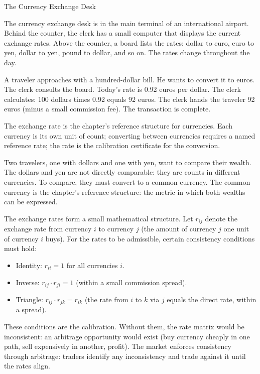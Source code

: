 \begin{coda}{The Currency Exchange Desk}

The currency exchange desk is in the main terminal of an international
airport. Behind the counter, the clerk has a small computer that
displays the current exchange rates. Above the counter, a board lists
the rates: dollar to euro, euro to yen, dollar to yen, pound to
dollar, and so on. The rates change throughout the day.

A traveler approaches with a hundred-dollar bill. He wants to
convert it to euros. The clerk consults the board. Today's
rate is 0.92 euros per dollar. The clerk calculates: 100 dollars
times 0.92 equals 92 euros. The clerk hands the traveler 92
euros (minus a small commission fee). The transaction is
complete.

The exchange rate is the chapter's reference structure for
currencies. Each currency is its own unit of count; converting
between currencies requires a named reference rate; the rate is
the calibration certificate for the conversion.

Two travelers, one with dollars and one with yen, want to
compare their wealth. The dollars and yen are not directly
comparable: they are counts in different currencies. To
compare, they must convert to a common currency. The common
currency is the chapter's reference structure: the metric in
which both wealths can be expressed.

The exchange rates form a small mathematical structure. Let
$r_{ij}$ denote the exchange rate from currency $i$ to currency
$j$ (the amount of currency $j$ one unit of currency $i$ buys).
For the rates to be admissible, certain consistency conditions
must hold:
\begin{itemize}
\item Identity: $r_{ii} = 1$ for all currencies $i$.
\item Inverse: $r_{ij} \cdot r_{ji} = 1$ (within a small
commission spread).
\item Triangle: $r_{ij} \cdot r_{jk} = r_{ik}$ (the rate from $i$
to $k$ via $j$ equals the direct rate, within a spread).
\end{itemize}

These conditions are the calibration. Without them, the rate
matrix would be inconsistent: an arbitrage opportunity would
exist (buy currency cheaply in one path, sell expensively in
another, profit). The market enforces consistency through
arbitrage: traders identify any inconsistency and trade against
it until the rates align.


\end{coda}
